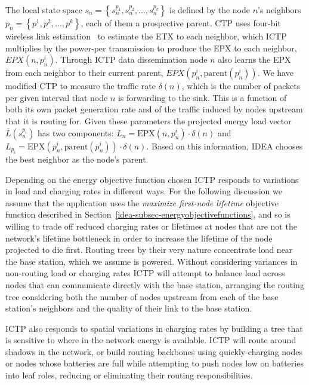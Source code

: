 The local state space $s_n = \left\{s_n^{p_1}, s_n^{p_2}, \ldots, s_n^{p_k}
\right\}$ is defined by the node $n$'s neighbors $p_n = \left\{p^1, p^2,
\ldots, p^k \right\}$, each of them a prospective parent. CTP uses four-bit
wireless link estimation~\cite{Fonseca07} to estimate the ETX to each
neighbor, which ICTP multiplies by the power-per transmission to produce the
EPX to each neighbor, $EPX(n, p_n^i)$. Through ICTP data dissemination node
$n$ also learns the EPX from each neighbor to their current parent,
$EPX(p_n^i, \textrm{parent}(p_n^i))$. We have modified CTP to measure the
traffic rate $\delta(n)$, which is the number of packets per given interval
that node $n$ is forwarding to the sink. This is a function of both its own
packet generation rate and of the traffic induced by nodes upstream that it
is routing for. Given these parameters the projected energy load vector
$\bar{L}(s_n^{p_i})$ has two components: $L_n = \textrm{EPX}(n, p_n^i) \cdot
\delta(n)$ and $L_{p_i} = \textrm{EPX}(p_n^i, \textrm{parent}(p_n^i)) \cdot
\delta(n)$. Based on this information, IDEA chooses the best neighbor as the
node's parent.

Depending on the energy objective function chosen ICTP responds to variations
in load and charging rates in different ways. For the following discussion we
assume that the application uses the \textit{maximize first-node lifetime}
objective function described in
Section~\ref{idea-subsec-energyobjectivefunctions}, and so is willing to
trade off reduced charging rates or lifetimes at nodes that are not the
network's lifetime bottleneck in order to increase the lifetime of the node
projected to die first. Routing trees by their very nature concentrate load
near the base station, which we assume is powered. Without considering
variances in non-routing load or charging rates ICTP will attempt to balance
load across nodes that can communicate directly with the base station,
arranging the routing tree considering both the number of nodes upstream from
each of the base station's neighbors and the quality of their link to the
base station.

ICTP also responds to spatial variations in charging rates by building a tree
that is sensitive to where in the network energy is available. ICTP will
route around shadows in the network, or build routing backbones using
quickly-charging nodes or nodes whose batteries are full while attempting to
push nodes low on batteries into leaf roles, reducing or eliminating their
routing responsibilities.


